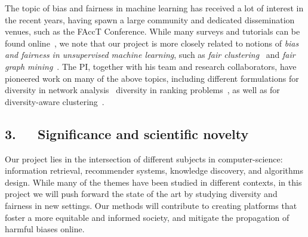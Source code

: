 \documentclass[a4paper,11pt]{article}
\begin{document}

The topic of bias and fairness in machine learning has received a lot of interest in the recent years, 
having spawn a large community and dedicated dissemination venues, such as the FAccT Conference. 
While many surveys and tutorials can be found online~\cite{caton2020fairness,mehrabi2021survey}, 
we note that our project is more closely related to notions of
\emph{bias and fairness in unsupervised machine learning}, 
such as 
\emph{fair clustering}~\cite{chierichetti2017fair}
and \emph{fair graph mining}~\cite{dong2023fairness}.
%
The PI, together with his team and research collaborators, 
have pioneered work on many of the above topics,
including
different formulations for diversity in network analysis~\cite{adriaens2023minimizing,cinus2023rebalancing,coupette2023reducing,oettershagen2024finding}
diversity in ranking problems~\cite{zhang2022ranking}, 
as well as for diversity-aware clustering~\cite{thejaswi2021diversity}.

\subsection*{3.~~~Significance and scientific novelty}



Our project lies in the intersection of different subjects in computer-science:
information retrieval, recommender systems, knowledge discovery, and algorithms design. 
While many of the themes have been studied in different contexts,
in this project we will push forward the state of the art 
by studying diversity and fairness in new settings.
Our methods will contribute to creating platforms that foster a more equitable and informed society, 
and mitigate the propagation of harmful biases online.
\end{document}
